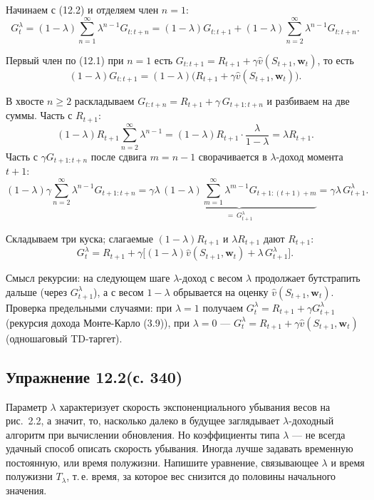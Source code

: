 \begin{solution}
    Начинаем с (12.2) и отделяем член $n=1$:
    \begin{equation*}
        G_t^\lambda = (1-\lambda)\sum_{n=1}^\infty \lambda^{n-1} G_{t:t+n}
        = (1-\lambda)G_{t:t+1} + (1-\lambda)\sum_{n=2}^\infty \lambda^{n-1} G_{t:t+n}.
    \end{equation*}

    Первый член по (12.1) при $n=1$ есть $G_{t:t+1}=R_{t+1}+\gamma\hat v(S_{t+1},\mathbf w_t)$, то есть
    \begin{equation*}
        (1-\lambda)G_{t:t+1} = (1-\lambda)\big(R_{t+1}+\gamma\hat v(S_{t+1},\mathbf w_t)\big).
    \end{equation*}

    В хвосте $n\ge 2$ раскладываем $G_{t:t+n}=R_{t+1}+\gamma\,G_{t+1:t+n}$ и разбиваем на две суммы. Часть с $R_{t+1}$:
    \begin{equation*}
        (1-\lambda)R_{t+1}\sum_{n=2}^\infty \lambda^{n-1}
        = (1-\lambda)R_{t+1}\cdot\frac{\lambda}{1-\lambda} = \lambda R_{t+1}.
    \end{equation*}
    Часть с $\gamma G_{t+1:t+n}$ после сдвига $m=n-1$ сворачивается в $\lambda$-доход момента $t+1$:
    \begin{equation*}
        (1-\lambda)\gamma\sum_{n=2}^\infty \lambda^{n-1} G_{t+1:t+n}
        = \gamma\lambda\,\underbrace{(1-\lambda)\sum_{m=1}^\infty \lambda^{m-1} G_{t+1:(t+1)+m}}_{=\,G_{t+1}^\lambda}
        = \gamma\lambda\,G_{t+1}^\lambda.
    \end{equation*}

    Складываем три куска; слагаемые $(1-\lambda)R_{t+1}$ и $\lambda R_{t+1}$ дают $R_{t+1}$:
    \begin{equation*}
        G_t^\lambda = R_{t+1} + \gamma\Big[(1-\lambda)\hat v(S_{t+1},\mathbf w_t) + \lambda\,G_{t+1}^\lambda\Big].
    \end{equation*}

    Смысл рекурсии: на следующем шаге $\lambda$-доход с весом $\lambda$ продолжает
    бутстрапить дальше (через $G_{t+1}^\lambda$), а с весом $1-\lambda$
    обрывается на оценку $\hat v(S_{t+1},\mathbf w_t)$. Проверка предельными
    случаями: при $\lambda=1$ получаем $G_t^\lambda=R_{t+1}+\gamma G_{t+1}^\lambda$
    (рекурсия дохода Монте-Карло (3.9)), при $\lambda=0$ ---
    $G_t^\lambda=R_{t+1}+\gamma\hat v(S_{t+1},\mathbf w_t)$ (одношаговый TD-таргет).
\end{solution}

\subsection{Упражнение 12.2(с. 340)}
Параметр $\lambda$ характеризует скорость экспоненциального убывания весов на
рис.~2.2, а значит, то, насколько далеко в будущее заглядывает $\lambda$-доходный
алгоритм при вычислении обновления. Но коэффициенты типа $\lambda$ --- не всегда
удачный способ описать скорость убывания. Иногда лучше задавать временную
постоянную, или время полужизни. Напишите уравнение, связывающее $\lambda$ и время
полужизни $T_\lambda$, т.\,е. время, за которое вес снизится до половины
начального значения.

